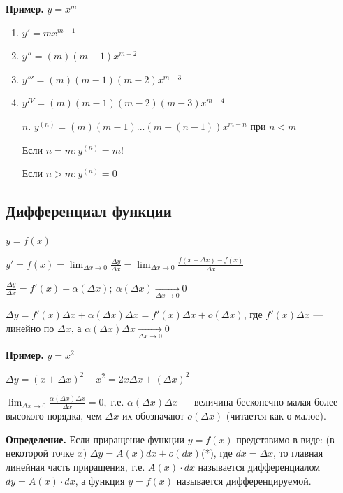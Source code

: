 \documentclass{article}
\begin{document}
    \textbf{Пример.} \( y = x^m \)

    \begin{enumerate}
        \item \( y' = mx^{m - 1} \)
        \item \( y'' = (m)(m - 1)x^{m - 2} \)
        \item \( y''' = (m)(m - 1)(m - 2)x^{m - 3} \)
        \item \( y^{IV} = (m)(m - 1)(m - 2)(m - 3)x^{m - 4} \)
        \item[\(n\).] \( y^{(n)} = (m)(m - 1)...(m - (n - 1))x^{m - n}\) при \(n < m\)
        
        Если \(n = m: y^{(n)} = m!\) 

        Если \(n > m: y^{(n)} = 0\)
    \end{enumerate}

    \subsection{Дифференциал функции}

    \( y = f(x) \)    

    \( y' = f(x) = \lim_{\Delta x \to 0}\frac{\Delta y}{\Delta x} = \lim_{\Delta x \to 0}\frac{f(x + \Delta x) - f(x)}{\Delta x} \)

    \( \frac{\Delta y}{\Delta x} = f'(x) + \alpha(\Delta x);\ \alpha(\Delta x) \xrightarrow[\Delta x \to 0]{} 0\)

    \( \Delta y = f'(x)\Delta x + \alpha(\Delta x)\Delta x = f'(x)\Delta x + o(\Delta x) \), где \(f'(x)\Delta x\) --- линейно по \(\Delta x\), а \(\alpha(\Delta x)\Delta x \xrightarrow[\Delta x \to 0]{} 0\)

    \textbf{Пример.} \( y = x^2 \)

    \( \Delta y = (x + \Delta x)^2 - x^2 = 2x\Delta x + (\Delta x)^2 \)

    \( \lim_{\Delta x \to 0}\frac{\alpha(\Delta x)\Delta x}{\Delta x} = 0 \), т.е. \(\alpha(\Delta x)\Delta x\) --- величина бесконечно малая более высокого порядка, чем \(\Delta x\) их обозначают \(o(\Delta x)\) (читается как о-малое).

    \textbf{Определение.} Если приращение функции \( y = f(x) \) представимо в виде: (в некоторой точке \(x\)) \( \Delta y = A(x)dx + o(dx) \)(*), где \( dx = \Delta x \), то главная линейная часть приращения, т.е. \(A(x)\cdot dx\) называется дифференциалом \(dy = A(x)\cdot dx\), а функция \( y = f(x) \) называется дифференцируемой.
\end{document}
